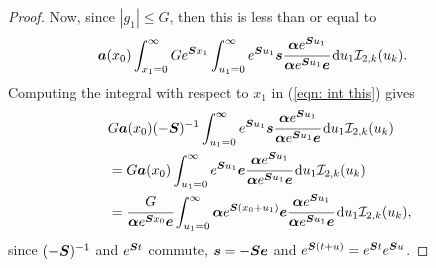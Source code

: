 \begin{proof}
	Now, since \(|g_1|\leq G\), then this is less than or equal to
	\begin{align}
		&\boldsymbol a (x_0) \int_{x_1=0}^\infty G  e^{\boldsymbol{S}x_1} \int_{u_1=0}^\infty e^{\boldsymbol{S}u_1}\boldsymbol s \cfrac{\boldsymbol \alpha e^{\boldsymbol{S}u_1}}{\boldsymbol \alpha e^{\boldsymbol{S}u_1}\boldsymbol e}\, \mathrm{d} u_1 \mathcal I_{2,k}(u_k).\label{eqn: int this}
	\end{align}
	Computing the integral with respect to \(x_1\) in (\ref{eqn: int this}) gives 
	\begin{align}
		 &G  \boldsymbol a (x_0)(-\boldsymbol{S})^{-1} \int_{u_1=0}^\infty e^{\boldsymbol{S}u_1}\boldsymbol s \cfrac{\boldsymbol \alpha e^{\boldsymbol{S}u_1}}{\boldsymbol \alpha e^{\boldsymbol{S}u_1}\boldsymbol e}\, \mathrm{d} u_1 \mathcal I_{2,k}(u_k) \nonumber 
		\\&= G \boldsymbol a (x_0)\int_{u_1=0}^\infty e^{\boldsymbol{S}u_1}\boldsymbol e \cfrac{\boldsymbol \alpha e^{\boldsymbol{S}u_1}}{\boldsymbol \alpha e^{\boldsymbol{S}u_1}\boldsymbol e}\, \mathrm{d} u_1\mathcal I_{2,k}(u_k) \nonumber 
		\\&=  \cfrac{G}{\boldsymbol \alpha e^{\boldsymbol{S}x_0}\boldsymbol e} \int_{u_1=0}^\infty \boldsymbol \alpha e^{\boldsymbol{S}(x_0+u_1)}\boldsymbol e \cfrac{\boldsymbol \alpha e^{\boldsymbol{S}u_1}}{\boldsymbol \alpha e^{\boldsymbol{S}u_1}\boldsymbol e}\, \mathrm{d} u_1\mathcal I_{2,k}(u_k), \label{eqn: yet another label}
	\end{align}
	since \((-\boldsymbol{S})^{-1}\) and \(e^{\boldsymbol{S}t}\) commute, \(\boldsymbol s = - \boldsymbol{S} \boldsymbol e \) and \(e^{\boldsymbol{S}(t+u)} = e^{\boldsymbol{S}t}e^{\boldsymbol{S}u}\). 
	

\end{proof}
